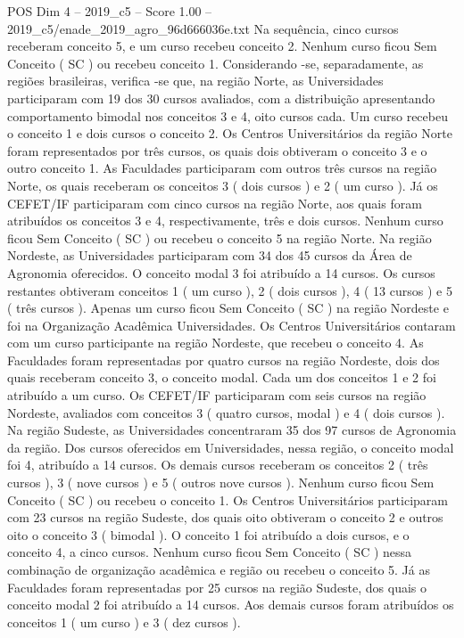\begin{textsample}{POS Dim 4 – 2019\_c5 – Score 1.00 – 2019\_c5/enade\_2019\_agro\_96d666036e.txt}
Na sequência, cinco cursos receberam conceito 5, e um curso recebeu conceito 2.
Nenhum curso ficou Sem Conceito ( SC ) ou recebeu conceito 1.
Considerando -se, separadamente, as regiões brasileiras, verifica -se que, na região Norte, as Universidades participaram com 19 dos 30 cursos avaliados, com a distribuição apresentando comportamento bimodal nos conceitos 3 e 4, oito cursos cada.
Um curso recebeu o conceito 1 e dois cursos o conceito 2.
Os Centros Universitários da região Norte foram representados por três cursos, os quais dois obtiveram o conceito 3 e o outro conceito 1.
As Faculdades participaram com outros três cursos na região Norte, os quais receberam os conceitos 3 ( dois cursos ) e 2 ( um curso ).
Já os CEFET/IF participaram com cinco cursos na região Norte, aos quais foram atribuídos os conceitos 3 e 4, respectivamente, três e dois cursos.
Nenhum curso ficou Sem Conceito ( SC ) ou recebeu o conceito 5 na região Norte.
Na região Nordeste, as Universidades participaram com 34 dos 45 cursos da Área de Agronomia oferecidos.
O conceito modal 3 foi atribuído a 14 cursos.
Os cursos restantes obtiveram conceitos 1 ( um curso ), 2 ( dois cursos ), 4 ( 13 cursos ) e 5 ( três cursos ).
Apenas um curso ficou Sem Conceito ( SC ) na região Nordeste e foi na Organização Acadêmica Universidades.
Os Centros Universitários contaram com um curso participante na região Nordeste, que recebeu o conceito 4.
As Faculdades foram representadas por quatro cursos na região Nordeste, dois dos quais receberam conceito 3, o conceito modal.
Cada um dos conceitos 1 e 2 foi atribuído a um curso.
Os CEFET/IF participaram com seis cursos na região Nordeste, avaliados com conceitos 3 ( quatro cursos, modal ) e 4 ( dois cursos ).
Na região Sudeste, as Universidades concentraram 35 dos 97 cursos de Agronomia da região.
Dos cursos oferecidos em Universidades, nessa região, o conceito modal foi 4, atribuído a 14 cursos.
Os demais cursos receberam os conceitos 2 ( três cursos ), 3 ( nove cursos ) e 5 ( outros nove cursos ).
Nenhum curso ficou Sem Conceito ( SC ) ou recebeu o conceito 1.
Os Centros Universitários participaram com 23 cursos na região Sudeste, dos quais oito obtiveram o conceito 2 e outros oito o conceito 3 ( bimodal ).
O conceito 1 foi atribuído a dois cursos, e o conceito 4, a cinco cursos.
Nenhum curso ficou Sem Conceito ( SC ) nessa combinação de organização acadêmica e região ou recebeu o conceito 5.
Já as Faculdades foram representadas por 25 cursos na região Sudeste, dos quais o conceito modal 2 foi atribuído a 14 cursos.
Aos demais cursos foram atribuídos os conceitos 1 ( um curso ) e 3 ( dez cursos ).

\end{textsample}
